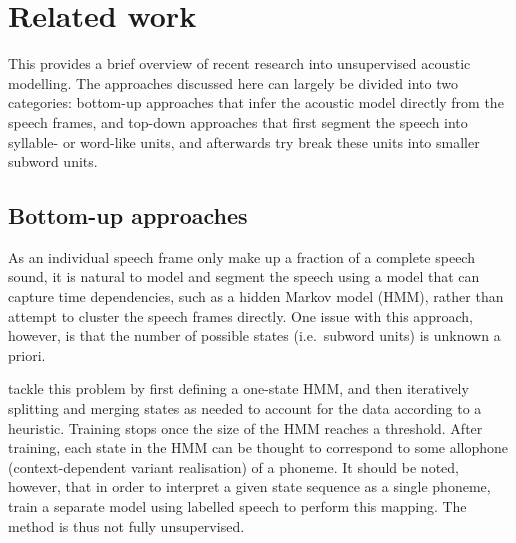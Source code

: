 %
%
%

\chapter{Related work}
\label{ch:related-work}

This  provides a brief overview of recent research into unsupervised acoustic modelling.
The approaches discussed here can largely be divided into two categories: bottom-up approaches that infer the acoustic model directly from the speech frames, and top-down approaches that first segment the speech into syllable- or word-like units, and afterwards try break these units into smaller subword units.

\section{Bottom-up approaches}

As an individual speech frame only make up a fraction of a complete speech sound, it is natural to model and segment the speech using a model that can capture time dependencies, such as a hidden Markov model (HMM), rather than attempt to cluster the speech frames directly.
One issue with this approach, however, is that the number of possible states (i.e.\ subword units) is unknown a priori.

\textcite{varadarajan2008unsupervised} tackle this problem by first defining a one-state HMM, and then iteratively splitting and merging states as needed to account for the data according to a heuristic.
Training stops once the size of the HMM reaches a threshold.
After training, each state in the HMM can be thought to correspond to some allophone (context-dependent variant realisation) of a phoneme.
It should be noted, however, that in order to interpret a given state sequence as a single phoneme, \citeauthor{varadarajan2008unsupervised} train a separate model using labelled speech to perform this mapping.
The method is thus not fully unsupervised.

